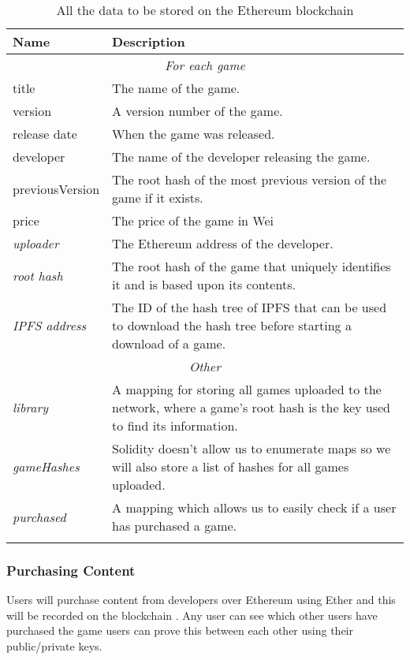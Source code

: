 \begin{longtable}{ p{} p{} }
  \toprule
  \textbf{Name} & \textbf{Description}
  \\\midrule\midrule
  \multicolumn{2}{c}{\cellcolor{red!70}\textit{For each game}} 
  \\\midrule
  title & The name of the game.\\
  version & A version number of the game.\\
  release date & When the game was released.\\
  developer & The name of the developer releasing the game.\\
  previousVersion & The root hash of the most previous version of the game if it exists.\\
  price & The price of the game in Wei\\
  \textit{uploader} & The Ethereum address of the developer.\\
  \textit{root hash} & The root hash of the game that uniquely identifies it and is based upon its contents.\\
  \textit{IPFS address} & The ID of the hash tree of IPFS that can be used to download the hash tree before starting a download of a game.\\\midrule
  \multicolumn{2}{c}{\cellcolor{green}\textit{Other}} 
  \\\midrule
  \textit{library} & A mapping for storing all games uploaded to the network, where a game's root hash is the key used to find its information.\\
  \textit{gameHashes} & Solidity doesn't allow us to enumerate maps so we will also store a list of hashes for all games uploaded.\\
  \textit{purchased} & A mapping which allows us to easily check if a user has purchased a game.
  \\\bottomrule\bottomrule
  \caption{All the data to be stored on the Ethereum blockchain}
\end{longtable}


\subsubsection*{Purchasing Content}

Users will purchase content from developers over Ethereum using Ether  and this will be recorded on the blockchain . Any user can see which other users have purchased the game users can prove this between each other using their public/private keys.